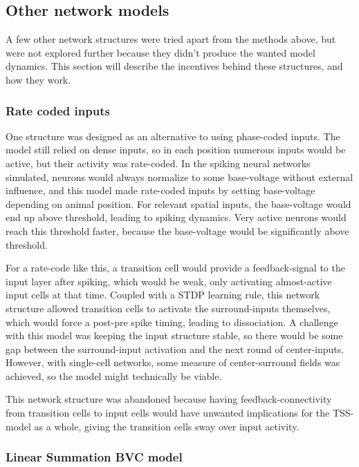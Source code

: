 \documentclass{article}
\begin{document}
    \subsection{Other network models} \label{Other Models}

    A few other network structures were tried apart from the methods above, but were not explored further because they didn't produce the wanted model dynamics. This section will describe the incentives behind these structures, and how they work.

    \subsubsection{Rate coded inputs} \label{Rate input}
    One structure was designed as an alternative to using phase-coded inputs. The model still relied on dense inputs, so in each position numerous inputs would be active, but their activity was rate-coded. In the spiking neural networks simulated, neurons would always normalize to some base-voltage without external influence, and this model made rate-coded inputs by setting base-voltage depending on animal position. For relevant spatial inputs, the base-voltage would end up above threshold, leading to spiking dynamics. Very active neurons would reach this threshold faster, because the base-voltage would be significantly above threshold.

    For a rate-code like this, a transition cell would provide a feedback-signal to the input layer after spiking, which would be weak, only activating almost-active input cells at that time. Coupled with a STDP learning rule, this network structure allowed transition cells to activate the surround-inputs themselves, which would force a post-pre spike timing, leading to dissociation. A challenge with this model was keeping the input structure stable, so there would be some gap between the surround-input activation and the next round of center-inputs. However, with single-cell networks, some measure of center-surround fields was achieved, so the model might technically be viable.

    This network structure was abandoned because having feedback-connectivity from transition cells to input cells would have unwanted implications for the TSS-model as a whole, giving the transition cells sway over input activity.

    \subsubsection{Linear Summation BVC model} \label{LinnSummBVC}
    
\end{document}
